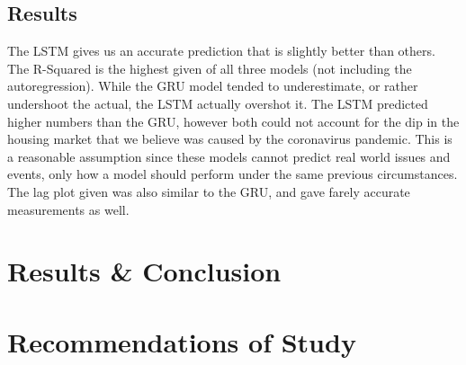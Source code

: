 \documentclass{article}
\begin{document}
	\subsection{Results}

	The LSTM gives us an accurate prediction that is slightly better than others. The R-Squared is the
	highest given of all three models (not including the autoregression). While the GRU model tended to
	underestimate, or rather undershoot the actual, the LSTM actually overshot it. The LSTM predicted
	higher numbers than the GRU, however both could not account for the dip in the housing market that 
	we believe was caused by the coronavirus pandemic. This is a reasonable assumption since these models
	cannot predict real world issues and events, only how a model should perform under the same previous
	circumstances. The lag plot given was also similar to the GRU, and gave farely accurate measurements
	as well.
	
	\section{Results \& Conclusion}
	\section{Recommendations of Study}
	
\end{document}
